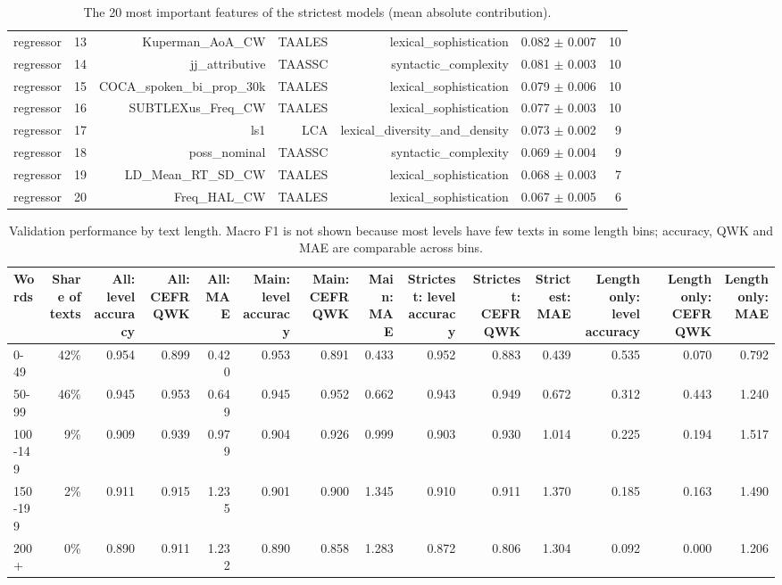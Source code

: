 \begin{table}[t]
\begin{tabular}{lrrrrrr}
regressor & 13 & Kuperman\_AoA\_CW & TAALES & lexical\_sophistication & 0.082 $\pm$ 0.007 & 10 \\
regressor & 14 & jj\_attributive & TAASSC & syntactic\_complexity & 0.081 $\pm$ 0.003 & 10 \\
regressor & 15 & COCA\_spoken\_bi\_prop\_30k & TAALES & lexical\_sophistication & 0.079 $\pm$ 0.006 & 10 \\
regressor & 16 & SUBTLEXus\_Freq\_CW & TAALES & lexical\_sophistication & 0.077 $\pm$ 0.003 & 10 \\
regressor & 17 & ls1 & LCA & lexical\_diversity\_and\_density & 0.073 $\pm$ 0.002 & 9 \\
regressor & 18 & poss\_nominal & TAASSC & syntactic\_complexity & 0.069 $\pm$ 0.004 & 9 \\
regressor & 19 & LD\_Mean\_RT\_SD\_CW & TAALES & lexical\_sophistication & 0.068 $\pm$ 0.003 & 7 \\
regressor & 20 & Freq\_HAL\_CW & TAALES & lexical\_sophistication & 0.067 $\pm$ 0.005 & 6 \\
\bottomrule
\end{tabular}
\caption{The 20 most important features of the strictest models (mean absolute contribution).}
\label{tab:table_7_top_features_strictest}
\end{table}

\begin{table}[t]
\centering
\small
\begin{tabular}{lrrrrrrrrrrrrr}
\toprule
Words & Share of texts & All: level accuracy & All: CEFR QWK & All: MAE & Main: level accuracy & Main: CEFR QWK & Main: MAE & Strictest: level accuracy & Strictest: CEFR QWK & Strictest: MAE & Length only: level accuracy & Length only: CEFR QWK & Length only: MAE \\
\midrule
0-49 & 42\% & 0.954 & 0.899 & 0.420 & 0.953 & 0.891 & 0.433 & 0.952 & 0.883 & 0.439 & 0.535 & 0.070 & 0.792 \\
50-99 & 46\% & 0.945 & 0.953 & 0.649 & 0.945 & 0.952 & 0.662 & 0.943 & 0.949 & 0.672 & 0.312 & 0.443 & 1.240 \\
100-149 & 9\% & 0.909 & 0.939 & 0.979 & 0.904 & 0.926 & 0.999 & 0.903 & 0.930 & 1.014 & 0.225 & 0.194 & 1.517 \\
150-199 & 2\% & 0.911 & 0.915 & 1.235 & 0.901 & 0.900 & 1.345 & 0.910 & 0.911 & 1.370 & 0.185 & 0.163 & 1.490 \\
200+ & 0\% & 0.890 & 0.911 & 1.232 & 0.890 & 0.858 & 1.283 & 0.872 & 0.806 & 1.304 & 0.092 & 0.000 & 1.206 \\
\bottomrule
\end{tabular}
\caption{Validation performance by text length. Macro F1 is not shown because most levels have few texts in some length bins; accuracy, QWK and MAE are comparable across bins.}
\label{tab:table_8_length_check}
\end{table}

